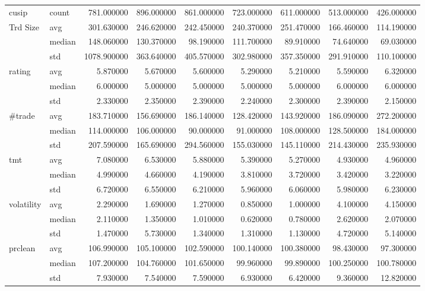 \documentclass{article}
\begin{document}
\begin{landscape}
\begin{table}[ht]
\begin{tabular}{llrrrrrrr}
cusip & count & 781.000000 & 896.000000 & 861.000000 & 723.000000 & 611.000000 & 513.000000 & 426.000000 \\
\cline{1-9}
\multirow[t]{3}{*}{Trd Size} & avg & 301.630000 & 246.620000 & 242.450000 & 240.370000 & 251.470000 & 166.460000 & 114.190000 \\
 & median & 148.060000 & 130.370000 & 98.190000 & 111.700000 & 89.910000 & 74.640000 & 69.030000 \\
 & std & 1078.900000 & 363.640000 & 405.570000 & 302.980000 & 357.350000 & 291.910000 & 110.100000 \\
\cline{1-9}
\multirow[t]{3}{*}{rating} & avg & 5.870000 & 5.670000 & 5.600000 & 5.290000 & 5.210000 & 5.590000 & 6.320000 \\
 & median & 6.000000 & 5.000000 & 5.000000 & 5.000000 & 5.000000 & 6.000000 & 6.000000 \\
 & std & 2.330000 & 2.350000 & 2.390000 & 2.240000 & 2.300000 & 2.390000 & 2.150000 \\
\cline{1-9}
\multirow[t]{3}{*}{#trade} & avg & 183.710000 & 156.690000 & 186.140000 & 128.420000 & 143.920000 & 186.090000 & 272.200000 \\
 & median & 114.000000 & 106.000000 & 90.000000 & 91.000000 & 108.000000 & 128.500000 & 184.000000 \\
 & std & 207.590000 & 165.690000 & 294.560000 & 155.030000 & 145.110000 & 214.430000 & 235.930000 \\
\cline{1-9}
\multirow[t]{3}{*}{tmt} & avg & 7.080000 & 6.530000 & 5.880000 & 5.390000 & 5.270000 & 4.930000 & 4.960000 \\
 & median & 4.990000 & 4.660000 & 4.190000 & 3.810000 & 3.720000 & 3.420000 & 3.220000 \\
 & std & 6.720000 & 6.550000 & 6.210000 & 5.960000 & 6.060000 & 5.980000 & 6.230000 \\
\cline{1-9}
\multirow[t]{3}{*}{volatility} & avg & 2.290000 & 1.690000 & 1.270000 & 0.850000 & 1.000000 & 4.100000 & 4.150000 \\
 & median & 2.110000 & 1.350000 & 1.010000 & 0.620000 & 0.780000 & 2.620000 & 2.070000 \\
 & std & 1.470000 & 5.730000 & 1.340000 & 1.310000 & 1.130000 & 4.720000 & 5.140000 \\
\cline{1-9}
\multirow[t]{3}{*}{prclean} & avg & 106.990000 & 105.100000 & 102.590000 & 100.140000 & 100.380000 & 98.430000 & 97.300000 \\
 & median & 107.200000 & 104.760000 & 101.650000 & 99.960000 & 99.890000 & 100.250000 & 100.780000 \\
 & std & 7.930000 & 7.540000 & 7.590000 & 6.930000 & 6.420000 & 9.360000 & 12.820000 \\
\cline{1-9}
\bottomrule
\end{tabular}



\end{table}
\end{landscape}
\end{document}
